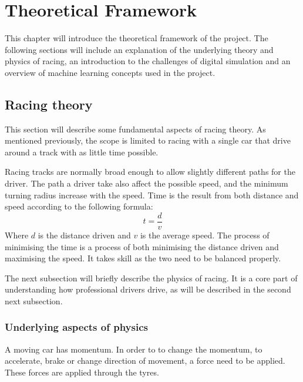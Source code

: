 \chapter{Theoretical Framework}
This chapter will introduce the theoretical framework of the project. The following sections will include an explanation of the underlying theory and physics of racing, an introduction to the challenges of digital simulation and an overview of machine learning concepts used in the project. 

\section{Racing theory}

This section will describe some fundamental aspects of racing theory. As mentioned previously, the scope is limited to racing with a single car that drive around a track with as little time possible.

Racing tracks are normally broad enough to allow slightly different paths for the driver. The path a driver take also affect the possible speed, and the minimum turning radius increase with the speed. Time is the result from both distance and speed according to the following formula:
\begin{equation}
t = \frac{d}{v}
\end{equation}
Where $d$ is the distance driven and $v$ is the average speed. The process of minimising the time is a process of both minimising the distance driven and maximising the speed. It takes skill as the two need to be balanced properly.

The next subsection will briefly describe the physics of racing. It is a core part of understanding how professional drivers drive, as will be described in the second next subsection.

\subsection{Underlying aspects of physics}
A moving car has momentum. In order to to change the momentum, to accelerate, brake or change direction of movement, a force need to be applied. These forces are applied through the tyres. 


